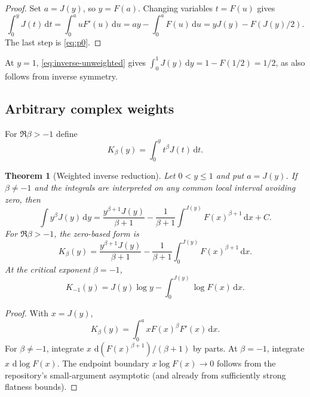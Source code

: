 \documentclass[11pt,oneside]{article}
\numberwithin{equation}{section}
\newtheorem{theorem}{Theorem}[section]
\theoremstyle{definition}
\theoremstyle{remark}
\newcommand{\InvF}{J}
\newcommand{\dd}{\,\mathrm d}
\begin{document}
\begin{proof}
Set $a=\InvF(y)$, so $y=F(a)$.  Changing variables $t=F(u)$ gives
\[
 \int_0^y\InvF(t)\dd t=\int_0^a uF'(u)\dd u
 =ay-\int_0^aF(u)\dd u
 =y\InvF(y)-F(\InvF(y)/2).
\]
The last step is \eqref{eq:p0}.
\end{proof}

At $y=1$, \eqref{eq:inverse-unweighted} gives
$\int_0^1\InvF(y)\dd y=1-F(1/2)=1/2$, as also follows from inverse symmetry.

\subsection{Arbitrary complex weights}
For $\Re\beta>-1$ define
\begin{equation}
 K_\beta(y)=\int_0^yt^\beta\InvF(t)\dd t.                 \label{eq:Kbeta-def}
\end{equation}

\begin{theorem}[Weighted inverse reduction]
\label{thm:inverse-weighted}
Let $0<y\le1$ and put $a=\InvF(y)$.  If $\beta\ne-1$ and the integrals are
interpreted on any common local interval avoiding zero, then
\begin{equation}
 \boxed{
 \int y^\beta\InvF(y)\dd y
 =\frac{y^{\beta+1}\InvF(y)}{\beta+1}
 -\frac1{\beta+1}\int^{\InvF(y)}F(x)^{\beta+1}\dd x+C.}  \label{eq:inverse-weighted-local}
\end{equation}
For $\Re\beta>-1$, the zero-based form is
\begin{equation}
 \boxed{
 K_\beta(y)=\frac{y^{\beta+1}\InvF(y)}{\beta+1}
 -\frac1{\beta+1}\int_0^{\InvF(y)}F(x)^{\beta+1}\dd x.} \label{eq:inverse-weighted}
\end{equation}
At the critical exponent $\beta=-1$,
\begin{equation}
 \boxed{
 K_{-1}(y)=\InvF(y)\log y-
 \int_0^{\InvF(y)}\log F(x)\dd x.}                       \label{eq:inverse-critical}
\end{equation}
\end{theorem}

\begin{proof}
With $x=\InvF(y)$,
\[
 K_\beta(y)=\int_0^a xF(x)^\beta F'(x)\dd x.
\]
For $\beta\ne-1$, integrate $x\,\dd(F(x)^{\beta+1})/(\beta+1)$ by parts.  At
$\beta=-1$, integrate $x\,\dd\log F(x)$.  The endpoint boundary
$x\log F(x)\to0$ follows from the repository's small-argument asymptotic (and
already from sufficiently strong flatness bounds).
\end{proof}
\end{document}
